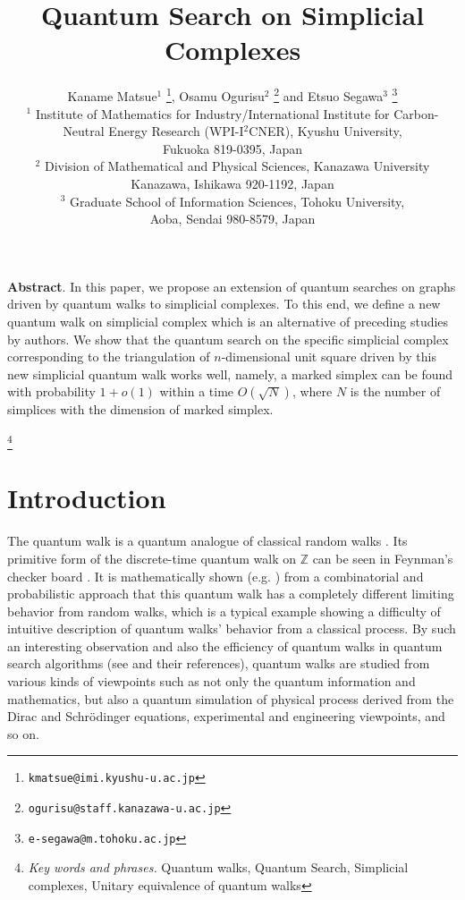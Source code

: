 \documentclass[a4paper,12pt]{article}
\title{{\Large {\bf Quantum Search on Simplicial Complexes%
}
}}
\author{ 
Kaname Matsue$^{1}$ %
\footnote{ 
{\tt kmatsue@imi.kyushu-u.ac.jp} %
},\quad
Osamu Ogurisu$^{2}$ %
\footnote{
{\tt ogurisu@staff.kanazawa-u.ac.jp}  %
}\quad
and
Etsuo Segawa$^{3}$ %
\footnote{%
{\tt e-segawa@m.tohoku.ac.jp}%
}
\\
{\scriptsize $^1$ 
Institute of Mathematics for Industry/International Institute for Carbon-Neutral Energy Research (WPI-I$^2$CNER), Kyushu University, %
}\\
{\scriptsize 
Fukuoka 819-0395, Japan %
} \\
{\scriptsize $^2$ 
Division of Mathematical and Physical Sciences, Kanazawa University %
}\\
{\scriptsize 
Kanazawa, Ishikawa 920-1192, Japan%
} \\
{\scriptsize $^3$ 
Graduate School of Information Sciences, Tohoku University,
}\\
{\scriptsize 
Aoba, Sendai 980-8579, Japan
} \\
}
\date{\empty }
\numberwithin{equation}{section}
\begin{document}
\maketitle

\par\noindent
\begin{small}
\par\noindent
{\bf Abstract}. 
In this paper, we propose an extension of quantum searches on graphs driven by quantum walks to simplicial complexes. 
To this end, we define a new quantum walk on simplicial complex which is an alternative of preceding studies by authors. 
We show that the quantum search on the specific simplicial complex corresponding to the triangulation of $n$-dimensional unit square 
driven by this new simplicial quantum walk works well, 
namely, a marked simplex can be found with probability $1+o(1)$ within a time $O(\sqrt{N})$, where $N$ is the number of simplices with the dimension of marked simplex.

\footnote[0]{
{\it Key words and phrases.} 
Quantum walks, Quantum Search, Simplicial complexes, Unitary equivalence of quantum walks
}

\end{small}



\setcounter{equation}{0}


%
%
\section{Introduction}
The quantum walk is a quantum analogue of classical random walks \cite{Gu}. 
Its primitive form of the discrete-time quantum walk on $\mathbb{Z}$ can be seen in Feynman's checker board \cite{FH}. 
It is mathematically shown (e.g. \cite{K1}) from a combinatorial and probabilistic approach 
that this quantum walk has a completely different limiting behavior from random walks, 
which is a typical example showing a difficulty of intuitive description of quantum walks' behavior from a classical process.
By such an interesting observation and also the efficiency of quantum walks in quantum search algorithms (see \cite{A1, K2} and their references), 
quantum walks are studied from various kinds of viewpoints such as not only the quantum information and mathematics, but also 
a quantum simulation of physical process derived from the Dirac and Schr\"{o}dinger equations, experimental and engineering viewpoints, and so on.
\par
\end{document}
